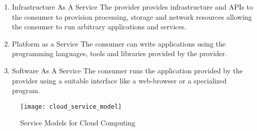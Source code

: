 \begin{enumerate}
    \item Infrastructure As A Service
        The provider provides infrastructure and APIs to the consumer to provision processing, storage and network resources allowing the consumer to run arbitrary applications and services.
    \item Platform as a Service
        The consumer can write applications using the programming languages, tools and libraries provided by the provider.
    \item Software As A Service
        The consumer runs the application provided by the provider using a suitable interface like a web-browser or a specialized program. 
\end{enumerate}

\begin{figure}[h!]
	\centering
    \texttt{[image: cloud\_service\_model]}
	\label{fig:8}
    \caption{Service Models for Cloud Computing \protect\cite{cloudservice}}
\end{figure}
